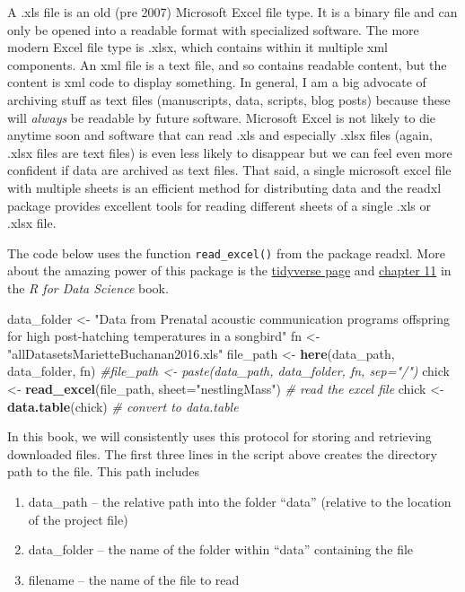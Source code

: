 \documentclass[]{book}
\newenvironment{Shaded}{\begin{snugshade}}{\end{snugshade}}
\newcommand{\KeywordTok}[1]{\textcolor[rgb]{0.13,0.29,0.53}{\textbf{#1}}}
\newcommand{\DataTypeTok}[1]{\textcolor[rgb]{0.13,0.29,0.53}{#1}}
\newcommand{\StringTok}[1]{\textcolor[rgb]{0.31,0.60,0.02}{#1}}
\newcommand{\CommentTok}[1]{\textcolor[rgb]{0.56,0.35,0.01}{\textit{#1}}}
\newcommand{\NormalTok}[1]{#1}
\providecommand{\tightlist}{%
  \setlength{\itemsep}{0pt}\setlength{\parskip}{0pt}}
\begin{document}
A .xls file is an old (pre 2007) Microsoft Excel file type. It is a
binary file and can only be opened into a readable format with
specialized software. The more modern Excel file type is .xlsx, which
contains within it multiple xml components. An xml file is a text file,
and so contains readable content, but the content is xml code to display
something. In general, I am a big advocate of archiving stuff as text
files (manuscripts, data, scripts, blog posts) because these will
\emph{always} be readable by future software. Microsoft Excel is not
likely to die anytime soon and software that can read .xls and
especially .xlsx files (again, .xlsx files are text files) is even less
likely to disappear but we can feel even more confident if data are
archived as text files. That said, a single microsoft excel file with
multiple sheets is an efficient method for distributing data and the
readxl package provides excellent tools for reading different sheets of
a single .xls or .xlsx file.

The code below uses the function \texttt{read\_excel()} from the package
readxl. More about the amazing power of this package is the
\href{https://readxl.tidyverse.org}{tidyverse page} and
\href{http://r4ds.had.co.nz/data-import.html}{chapter 11} in the \emph{R
for Data Science} book.

\begin{Shaded}
\begin{Highlighting}[]
\NormalTok{data_folder <-}\StringTok{ "Data from Prenatal acoustic communication programs offspring for high post-hatching temperatures in a songbird"}
\NormalTok{fn <-}\StringTok{ "allDatasetsMarietteBuchanan2016.xls"}
\NormalTok{file_path <-}\StringTok{ }\KeywordTok{here}\NormalTok{(data_path, data_folder, fn)}
\CommentTok{#file_path <- paste(data_path, data_folder, fn, sep="/")}
\NormalTok{chick <-}\StringTok{ }\KeywordTok{read_excel}\NormalTok{(file_path, }\DataTypeTok{sheet=}\StringTok{"nestlingMass"}\NormalTok{) }\CommentTok{# read the excel file}
\NormalTok{chick <-}\StringTok{ }\KeywordTok{data.table}\NormalTok{(chick) }\CommentTok{# convert to data.table}
\end{Highlighting}
\end{Shaded}

In this book, we will consistently uses this protocol for storing and
retrieving downloaded files. The first three lines in the script above
creates the directory path to the file. This path includes

\begin{enumerate}
\def\labelenumi{\arabic{enumi}.}
\tightlist
\item
  data\_path -- the relative path into the folder ``data'' (relative to
  the location of the project file)
\item
  data\_folder -- the name of the folder within ``data'' containing the
  file
\item
  filename -- the name of the file to read
\end{enumerate}
\end{document}
